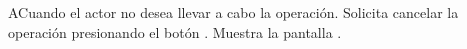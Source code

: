 
\begin{UCtrayectoriaA}{A}{Cuando el actor no desea llevar a cabo la operación.}
	\UCpaso [\UCactor] Solicita cancelar la operación presionando el botón .
	\UCpaso Muestra la pantalla .
\end{UCtrayectoriaA}

